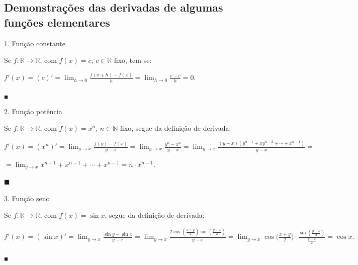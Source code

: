 \documentclass{article}
\begin{document}
{\begin{newpage}
\subsection{Demonstrações das derivadas de algumas funções elementares}
\par
\vspace{0.3cm}
\begin{flushleft}
1. Função constante
\end{flushleft}
\par Se $f:\mathbb{R}\rightarrow\mathbb{R}$, com $f(x)=c$, $c\in\mathbb{R}$ fixo, tem-se:
\par $f'(x)=(c)'= \displaystyle{\lim_{h\to 0}} \displaystyle{\frac{f(x+h)-f(x)}{h}} = \displaystyle{\lim_{h\to 0}} \frac{c-c}{h} = 0. $ \begin{flushright} $_{\blacksquare }$ \end{flushright}
\par
\vspace{0.3cm}
\begin{flushleft}
2. Função potência
\end{flushleft}
\par Se $f:\mathbb{R}\rightarrow\mathbb{R}$, com $f(x)=x^n$, $n\in\mathbb{N}$ fixo, segue da definição de derivada:
\par $f'(x)=(x^n)'=\displaystyle{\lim_{y\to x}} \frac{f(y) - f(x)}{y-x}=\displaystyle{\lim_{y\to x}} \frac{y^n - x^n}{y-x}=\displaystyle{\lim_{y\to x}} \frac{(y-x)(y^{n-1}+xy^{n-2}+\cdots +x^{n-1})}{y-x}= $\par$ = \displaystyle{\lim_{y\to x}} x^{n-1}+x^{n-1}+\cdots +x^{n-1}=n\cdot x^{n-1}.$\begin{flushright}$\blacksquare $\end{flushright}
\par
\vspace{0.3cm}
\begin{flushleft}
3. Função seno
\end{flushleft}
\par Se $f:\mathbb{R}\rightarrow\mathbb{R}$, com $f(x)=\sin{x}$, segue da definição de derivada:
\par $f'(x)=(\sin{x})'=\displaystyle{\lim_{y\to x}} \frac{\sin{y} - \sin{x}}{y-x} = \displaystyle{\lim_{y\to x}} \displaystyle{\frac{2\cos{(\frac{x+y}{2})}\sin{(\frac{y-x}{2})}}{y-x}} = \displaystyle{\lim_{y\to x}} \cos{\Big(\frac{x+y}{2}\Big)}\cdot\frac{\sin{(\frac{y-x}{2})}}{\frac{y-x}{2}} = \cos{x}.$\begin{flushright} $_{\blacksquare }$ \end{flushright}

\end{newpage}}
\end{document}
